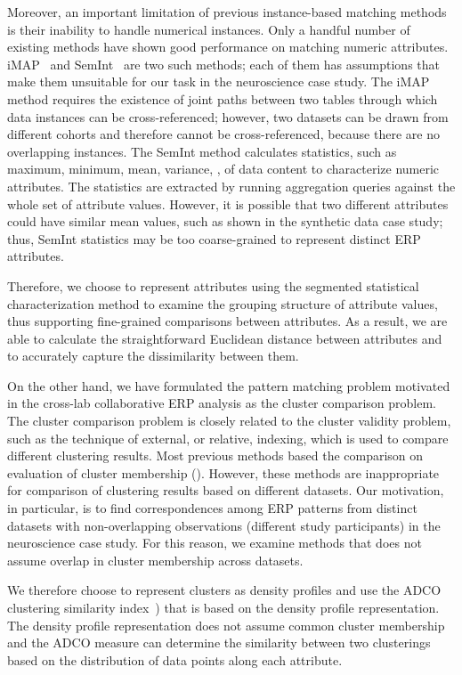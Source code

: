Moreover, an important limitation of previous instance-based matching methods is their inability to handle numerical instances. Only a handful number of existing methods have shown good performance on matching numeric attributes. iMAP~\cite{Dhamankar04imap} and SemInt~\cite{Li00semint:a} are two such methods; each of them has assumptions that make them unsuitable for our task in the neuroscience case study. The iMAP method requires the existence of joint paths between two tables through which data instances can be cross-referenced; however, two datasets can be drawn from different cohorts and therefore cannot be cross-referenced, because there are no overlapping instances. The SemInt method calculates statistics, such as maximum, minimum, mean, variance, \etc, of data content to characterize numeric attributes. The statistics are extracted by running aggregation queries against the whole set of attribute values. However, it is possible that two different attributes could have similar mean values, such as shown in the synthetic data case study; thus, SemInt statistics may be too coarse-grained to represent distinct ERP attributes.

Therefore, we choose to represent attributes using the segmented statistical characterization method to examine the grouping structure of attribute values, thus supporting fine-grained comparisons between attributes. As a result, we are able to calculate the straightforward Euclidean distance between attributes and to accurately capture the dissimilarity between them.

On the other hand, we have formulated the pattern matching problem motivated in the cross-lab collaborative ERP analysis as the cluster comparison problem. The cluster comparison problem is closely related to the cluster validity problem, such as the technique of external, or relative, indexing, which is used to compare different clustering results. Most previous methods based the comparison on evaluation of cluster membership (\cite{Rand71,Hamers1989,Fred03}). However, these methods are inappropriate for comparison of clustering results based on different datasets. Our motivation, in particular, is to find correspondences among ERP patterns from distinct datasets with non-overlapping observations (different study participants) in the neuroscience case study. For this reason, we examine methods that does not assume overlap in cluster membership across datasets.

We therefore choose to represent clusters as density profiles and use the ADCO clustering similarity index~\cite{Bae2010}) that is based on the density profile representation. The density profile representation does not assume common cluster membership and the ADCO measure can determine the similarity between two clusterings based on the distribution of data points along each attribute.

